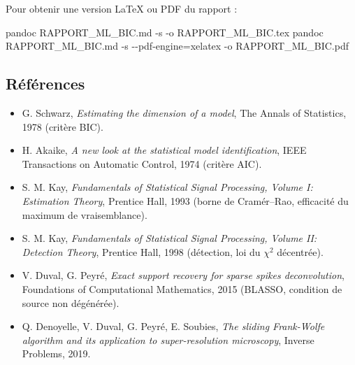 \documentclass[
  french,
]{article}
\newenvironment{Shaded}{}{}
\newcommand{\AttributeTok}[1]{\textcolor[rgb]{0.49,0.56,0.16}{#1}}
\newcommand{\ExtensionTok}[1]{#1}
\newcommand{\NormalTok}[1]{#1}
\newcommand{\OperatorTok}[1]{\textcolor[rgb]{0.40,0.40,0.40}{#1}}
\providecommand{\tightlist}{%
  \setlength{\itemsep}{0pt}\setlength{\parskip}{0pt}}
\begin{document}
Pour obtenir une version LaTeX ou PDF du rapport :

\begin{Shaded}
\begin{Highlighting}[]
\ExtensionTok{pandoc}\NormalTok{ RAPPORT\_ML\_BIC.md }\AttributeTok{{-}s} \AttributeTok{{-}o}\NormalTok{ RAPPORT\_ML\_BIC.tex}
\ExtensionTok{pandoc}\NormalTok{ RAPPORT\_ML\_BIC.md }\AttributeTok{{-}s} \AttributeTok{{-}{-}pdf{-}engine}\OperatorTok{=}\NormalTok{xelatex }\AttributeTok{{-}o}\NormalTok{ RAPPORT\_ML\_BIC.pdf}
\end{Highlighting}
\end{Shaded}

\subsection{Références}\label{ruxe9fuxe9rences}

\begin{itemize}
\tightlist
\item
  G. Schwarz, \emph{Estimating the dimension of a model}, The Annals of
  Statistics, 1978 (critère BIC).
\item
  H. Akaike, \emph{A new look at the statistical model identification},
  IEEE Transactions on Automatic Control, 1974 (critère AIC).
\item
  S. M. Kay, \emph{Fundamentals of Statistical Signal Processing, Volume
  I: Estimation Theory}, Prentice Hall, 1993 (borne de Cramér--Rao,
  efficacité du maximum de vraisemblance).
\item
  S. M. Kay, \emph{Fundamentals of Statistical Signal Processing, Volume
  II: Detection Theory}, Prentice Hall, 1998 (détection, loi du
  \(\chi^2\) décentrée).
\item
  V. Duval, G. Peyré, \emph{Exact support recovery for sparse spikes
  deconvolution}, Foundations of Computational Mathematics, 2015
  (BLASSO, condition de source non dégénérée).
\item
  Q. Denoyelle, V. Duval, G. Peyré, E. Soubies, \emph{The sliding
  Frank-Wolfe algorithm and its application to super-resolution
  microscopy}, Inverse Problems, 2019.
\end{itemize}
\end{document}
